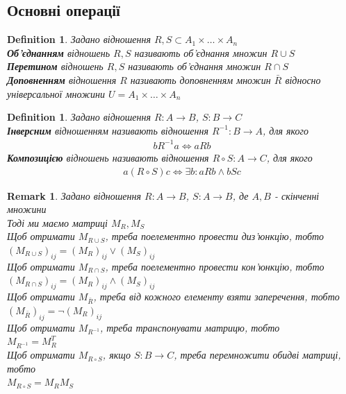 \documentclass[a4paper, 14pt]{extarticle}
\theoremstyle{theoremdd}
\theoremstyle{theoremdd}
\newtheorem{definition}[theorem]{Definition}
\theoremstyle{theoremdd}
\theoremstyle{theoremdd}
\theoremstyle{theoremdd}
\theoremstyle{theoremdd}
\newtheorem{remark}[theorem]{Remark}
\theoremstyle{theoremdd}
\theoremstyle{theoremdd}
\begin{document}
\subsection{Основні операції}
\begin{definition}
Задано відношення $R,S \subset A_1 \times \dots \times A_n$\\
\textbf{Об'єднанням} відношень $R,S$ називають об'єднання множин $R \cup S$\\
\textbf{Перетином} відношень $R,S$ називають об'єднання множин $R \cap S$\\
\textbf{Доповненням} відношення $R$ називають доповненням множин $\bar{R}$ відносно універсальної множини $U = A_1 \times \dots \times A_n$
\end{definition}

\begin{definition}
Задано відношення $R: A \to B$, $S: B \to C$ \\
\textbf{Інверсним} відношенням називають відношення $R^{-1}: B \to A$, для якого
\begin{align*}
bR^{-1}a \iff aRb
\end{align*}
\textbf{Композицією} відношень називають відношення $R \circ S: A \to C$, для якого
\begin{align*}
a(R \circ S)c \iff \exists b: aRb \wedge bSc
\end{align*}
\end{definition}

\begin{remark}
Задано відношення $R: A \to B$, $S: A \to B$, де $A,B$ - скінченні множини \\
Тоді ми маємо матриці $M_R, M_S$\\
Щоб отримати $M_{R \cup S}$, треба поелементно провести диз'юнкцію, тобто \\ $(M_{R \cup S})_{ij} = (M_R)_{ij} \vee (M_S)_{ij}$\\
Щоб отримати $M_{R \cap S}$, треба поелементно провести кон'юнкцію, тобто \\ $(M_{R \cap S})_{ij} = (M_R)_{ij} \wedge (M_S)_{ij}$\\
Щоб отримати $M_{\bar{R}}$, треба від кожного елементу взяти заперечення, тобто \\ $(M_{\bar{R}})_{ij} = \neg (M_R)_{ij}$\\
Щоб отримати $M_{R^{-1}}$, треба транспонувати матрицю, тобто \\ $M_{R^{-1}} = M_R^T$\\
Щоб отримати $M_{R \circ S}$, якщо $S: B \to C$, треба перемножити обидві матриці, тобто \\ $M_{R \circ S} = M_R M_S$
\end{remark}
\end{document}
